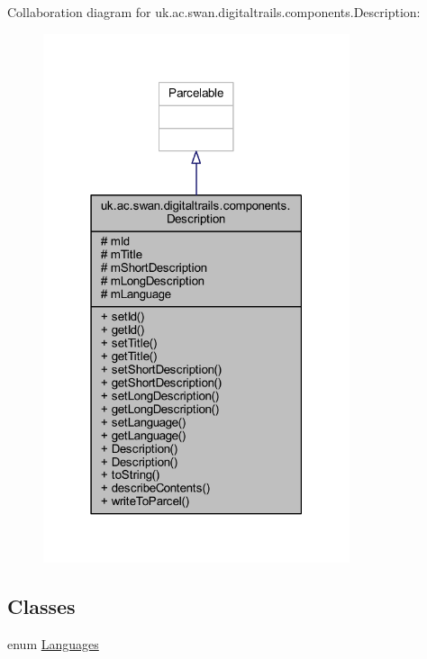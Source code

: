 Collaboration diagram for uk.\+ac.\+swan.\+digitaltrails.\+components.\+Description\+:
\nopagebreak
\begin{figure}[H]
\begin{center}
\leavevmode
\includegraphics[width=255pt]{classuk_1_1ac_1_1swan_1_1digitaltrails_1_1components_1_1_description__coll__graph}
\end{center}
\end{figure}
\subsection*{Classes}
\begin{DoxyCompactItemize}
\item 
enum \hyperlink{enumuk_1_1ac_1_1swan_1_1digitaltrails_1_1components_1_1_description_1_1_languages}{Languages}
\end{DoxyCompactItemize}
